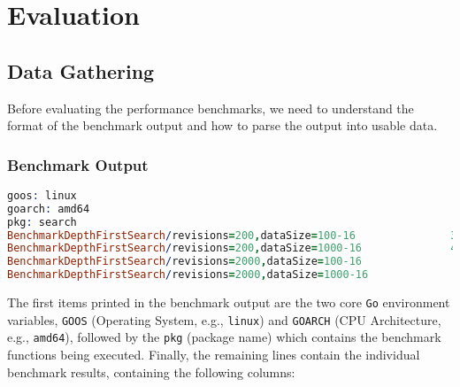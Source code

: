 \chapter{Evaluation} %
\label{chap:eval}

\section{Data Gathering}
\noindent
Before evaluating the performance benchmarks, we need to understand the format of the benchmark output and how to parse the output into usable data.

\subsection*{Benchmark Output}

\begin{lstlisting}[language=prolog]
goos: linux
goarch: amd64
pkg: search
BenchmarkDepthFirstSearch/revisions=200,dataSize=100-16         	  393714	      8504 ns/op	    4249 B/op	      15 allocs/op
BenchmarkDepthFirstSearch/revisions=200,dataSize=1000-16        	  419702	      8537 ns/op	    4256 B/op	      15 allocs/op
BenchmarkDepthFirstSearch/revisions=2000,dataSize=100-16        	   39650	     90070 ns/op	   47976 B/op	      68 allocs/op
BenchmarkDepthFirstSearch/revisions=2000,dataSize=1000-16       	   39520	     92031 ns/op	   48012 B/op	      68 allocs/op
\end{lstlisting}
\medskip

The first items printed in the benchmark output are the two core \lstinline{Go} environment variables, \lstinline{GOOS} (Operating System, e.g., \lstinline{linux}) and \lstinline{GOARCH} (CPU Architecture, e.g., \lstinline{amd64}), followed by the \lstinline{pkg} (package name) which contains the benchmark functions being executed. Finally, the remaining lines contain the individual benchmark results, containing the following columns\cite{andile_2023}:

